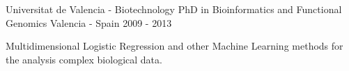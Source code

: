 


\begin{cventries}



\cventry
{Universitat de Valencia - Biotechnology} %
{PhD in Bioinformatics and Functional Genomics} %
{Valencia - Spain} %
{2009 - 2013} %
{ %
\begin{cvitems}
\item {Multidimensional Logistic Regression and other Machine Learning methods for the analysis complex biological data.}
\end{cvitems}
}



\end{cventries}
